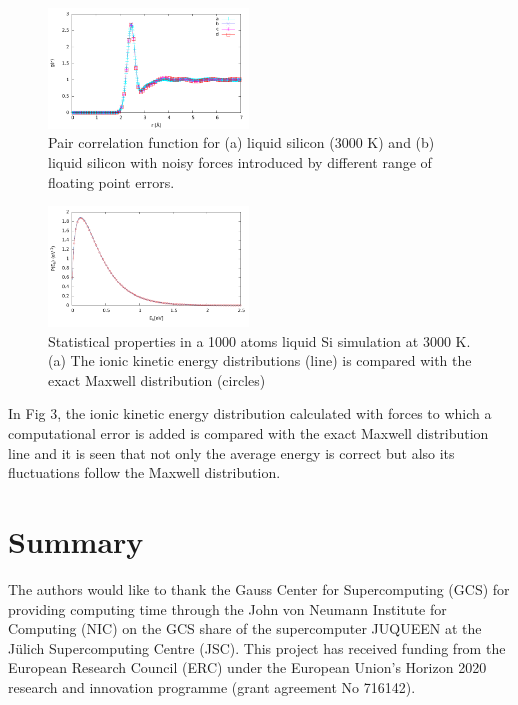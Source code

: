 \documentclass[aps,pre,twocolumn,showpacs,preprintnumbers,amsmath,amssymb]{revtex4-1}
\begin{document}
\begin{figure}[h!]%
\begin{center}
\includegraphics[width=0.475\textwidth]
{figures/rdffloatingpt.pdf}
\end{center}
\caption{\label{Fig2}
Pair correlation function for (a) liquid silicon (3000 K) and (b) liquid silicon with noisy forces introduced by different range of floating point errors.
} \end{figure}

\begin{figure}[h!]%
\begin{center}
\includegraphics[width=0.475\textwidth]
{figures/test1.pdf}
\end{center}
\caption{\label{Fig3}
Statistical properties in a 1000 atoms liquid Si simulation at 3000 K. (a) The ionic kinetic energy distributions (line) is compared with the exact Maxwell distribution (circles)
} \end{figure}

In Fig 3, the ionic kinetic energy distribution calculated with forces to which a computational error is added is compared with the exact Maxwell distribution line and it is seen that not only the average energy is correct but also its fluctuations follow the Maxwell distribution. 



\section{Summary}




\begin{acknowledgments}
The authors would like to thank the Gauss Center for Supercomputing (GCS) for providing computing time through the John von Neumann Institute for Computing (NIC) on the GCS share of the supercomputer JUQUEEN at the J\"ulich Supercomputing Centre (JSC). This project has received funding from the European Research Council (ERC) under the European Union's Horizon 2020 research and innovation programme (grant agreement No 716142).
\end{acknowledgments}
\end{document}
